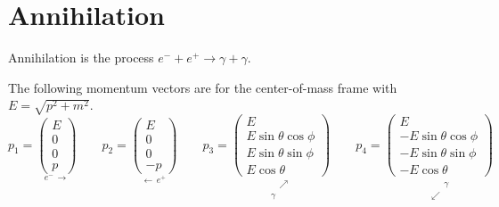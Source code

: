 

\section*{Annihilation}

Annihilation is the process $e^-+e^+\rightarrow\gamma+\gamma$.

\begin{center}
\end{center}

The following momentum vectors are for the center-of-mass frame with $E=\sqrt{p^2+m^2}$.
\begin{equation*}
p_1=\underset{e^- \, \longrightarrow}
{\begin{pmatrix}E\\0\\0\\p\end{pmatrix}}
\qquad
p_2=\underset{\longleftarrow \, e^+}
{\begin{pmatrix}E\\0\\0\\-p\end{pmatrix}}
\qquad
p_3=\underset{\substack{\phantom{\gamma} \, \nearrow\\\gamma \, \phantom{\nearrow}}}
{\begin{pmatrix}E\\ E\sin\theta\cos\phi\\ E\sin\theta\sin\phi\\ E\cos\theta\end{pmatrix}}
\qquad
p_4=\underset{\substack{\phantom{\swarrow} \, \gamma\\\swarrow \, \phantom{\gamma}}}
{\begin{pmatrix}E\\ -E\sin\theta\cos\phi\\ -E\sin\theta\sin\phi\\ -E\cos\theta\end{pmatrix}}
\end{equation*}

